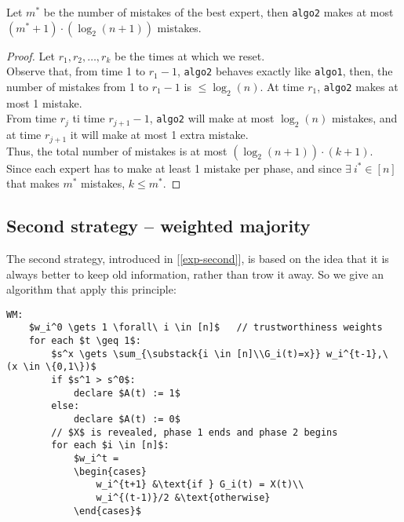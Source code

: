 \begin{lem}\label{lem:exp-algo2-errors}
    Let $m^*$ be the number of mistakes of the best expert, then \texttt{algo2} makes at most\\
    $(m^*+1)\cdot(\log_2(n+1))$ mistakes.
\end{lem}
\begin{proof}
    Let $r_1, r_2, \ldots, r_k$ be the times at which we reset.\\
    Observe that, from time 1 to $r_1-1$, \texttt{algo2} behaves exactly like \texttt{algo1}, then, the number of mistakes from 1 to $r_1-1$ is $\leq \log_2(n)$.
    At time $r_1$, \texttt{algo2} makes at most 1 mistake.\\
    From time $r_j$ ti time $r_{j+1}-1$, \texttt{algo2} will make at most $\log_2(n)$ mistakes, and at time $r_{j+1}$ it will make at most 1 extra mistake.\\
    Thus, the total number of mistakes is at most $(\log_2(n+1))\cdot(k+1)$.\\
    Since each expert has to make at least 1 mistake per phase, and since $\exists\ i^* \in [n]$ that makes $m^*$ mistakes, $k \leq m^*$.
\end{proof}


\subsection{Second strategy -- weighted majority} \label{sec:exp-weighted-maj}

The second strategy, introduced in [\ref{exp-second}], is based on the idea that it is always better to keep old information, rather than trow it away. So we give an algorithm that apply this principle:

\begin{lstlisting}[caption={Weighted Majority}, label={lst:exp-wm}]
WM:
    $w_i^0 \gets 1 \forall\ i \in [n]$   // trustworthiness weights
    for each $t \geq 1$:
        $s^x \gets \sum_{\substack{i \in [n]\\G_i(t)=x}} w_i^{t-1},\ (x \in \{0,1\})$
        if $s^1 > s^0$:
            declare $A(t) := 1$
        else:
            declare $A(t) := 0$
        // $X$ is revealed, phase 1 ends and phase 2 begins
        for each $i \in [n]$:
            $w_i^t = 
            \begin{cases}
                w_i^{t+1} &\text{if } G_i(t) = X(t)\\
                w_i^{(t-1)}/2 &\text{otherwise}
            \end{cases}$
\end{lstlisting}

